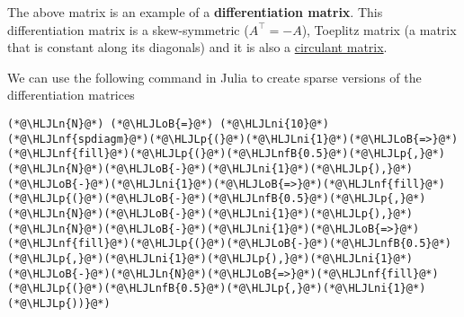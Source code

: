 \documentclass[12pt,a4paper]{article}
\newcommand{\HLJLn}[1]{#1}
\newcommand{\HLJLnf}[1]{\textcolor[RGB]{66,102,213}{#1}}
\newcommand{\HLJLnfB}[1]{\textcolor[RGB]{59,151,46}{#1}}
\newcommand{\HLJLni}[1]{\textcolor[RGB]{59,151,46}{#1}}
\newcommand{\HLJLoB}[1]{\textcolor[RGB]{102,102,102}{\textbf{#1}}}
\newcommand{\HLJLp}[1]{#1}
\begin{document}
The above matrix is an example of a \textbf{differentiation matrix}.  This differentiation matrix is a skew-symmetric ($A^{\top} = -A$), Toeplitz matrix (a matrix that is constant along its diagonals) and it is also a \href{https://en.wikipedia.org/wiki/Circulant_matrix}{circulant matrix}.  

We can use the following command in Julia to create sparse versions of the differentiation matrices


\begin{lstlisting}
(*@\HLJLn{N}@*) (*@\HLJLoB{=}@*) (*@\HLJLni{10}@*)
(*@\HLJLnf{spdiagm}@*)(*@\HLJLp{(}@*)(*@\HLJLni{1}@*)(*@\HLJLoB{=>}@*)(*@\HLJLnf{fill}@*)(*@\HLJLp{(}@*)(*@\HLJLnfB{0.5}@*)(*@\HLJLp{,}@*)(*@\HLJLn{N}@*)(*@\HLJLoB{-}@*)(*@\HLJLni{1}@*)(*@\HLJLp{),}@*)(*@\HLJLoB{-}@*)(*@\HLJLni{1}@*)(*@\HLJLoB{=>}@*)(*@\HLJLnf{fill}@*)(*@\HLJLp{(}@*)(*@\HLJLoB{-}@*)(*@\HLJLnfB{0.5}@*)(*@\HLJLp{,}@*)(*@\HLJLn{N}@*)(*@\HLJLoB{-}@*)(*@\HLJLni{1}@*)(*@\HLJLp{),}@*)(*@\HLJLn{N}@*)(*@\HLJLoB{-}@*)(*@\HLJLni{1}@*)(*@\HLJLoB{=>}@*)(*@\HLJLnf{fill}@*)(*@\HLJLp{(}@*)(*@\HLJLoB{-}@*)(*@\HLJLnfB{0.5}@*)(*@\HLJLp{,}@*)(*@\HLJLni{1}@*)(*@\HLJLp{),}@*)(*@\HLJLni{1}@*)(*@\HLJLoB{-}@*)(*@\HLJLn{N}@*)(*@\HLJLoB{=>}@*)(*@\HLJLnf{fill}@*)(*@\HLJLp{(}@*)(*@\HLJLnfB{0.5}@*)(*@\HLJLp{,}@*)(*@\HLJLni{1}@*)(*@\HLJLp{))}@*)
\end{lstlisting}
\end{document}
